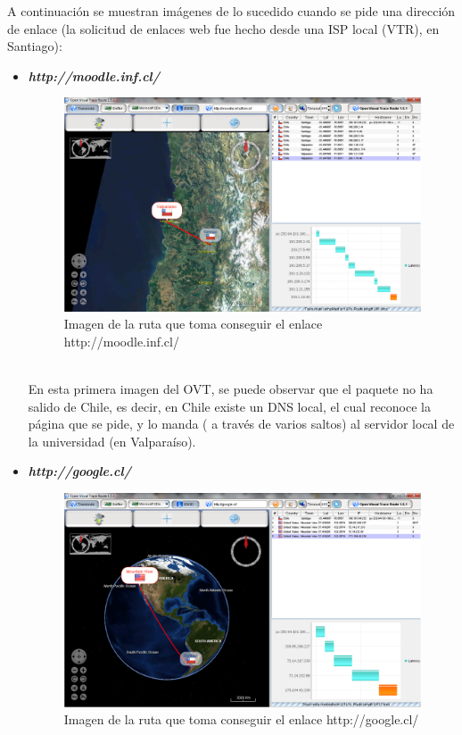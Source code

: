 \documentclass[a4paper,10pt]{article}
\begin{document}
A continuación se muestran imágenes de lo sucedido cuando se pide una dirección de enlace (la solicitud de enlaces web fue hecho desde una ISP local (VTR), en Santiago):\\ 
\begin{itemize}
 \item \textbf{\textsl{ http://moodle.inf.cl/}}\\

\begin{figure}[H]
\centering
\includegraphics[height=8 cm]{imagenes/enlace1.png}
\caption{Imagen de la ruta que toma conseguir el enlace http://moodle.inf.cl/ }
\end{figure} \\ 

En esta primera imagen del OVT, se puede observar que el paquete no ha salido de Chile, es decir, en Chile existe un DNS local, el cual reconoce la página que se pide, y lo manda ( a través de varios saltos) al servidor local de la universidad (en Valparaíso). \\

 \item  \textbf{\textsl{http://google.cl/}}\\

\begin{figure}[H]
\centering
\includegraphics[height=8 cm]{imagenes/enlace2.png}
\caption{Imagen de la ruta que toma conseguir el enlace http://google.cl/ }
\end{figure} \\ 


\end{itemize}
\end{document}
